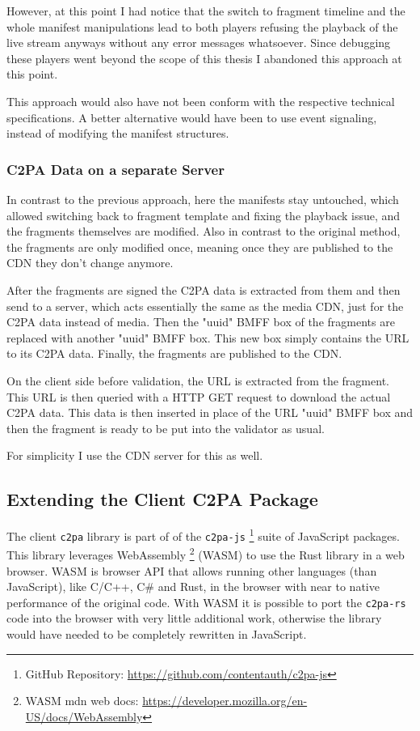 However, at this point I had notice that the switch to fragment timeline and the whole manifest manipulations lead to both players refusing the playback of the live stream anyways without any error messages whatsoever. Since debugging these players went beyond the scope of this thesis I abandoned this approach at this point. 

This approach would also have not been conform with the respective technical specifications. A better alternative would have been to use event signaling, instead of modifying the manifest structures. 

\subsubsection{C2PA Data on a separate Server\label{sec:on_server}}

In contrast to the previous approach, here the manifests stay untouched, which allowed switching back to fragment template and fixing the playback issue, and the fragments themselves are modified. Also in contrast to the original method, the fragments are only modified once, meaning once they are published to the CDN they don't change anymore.

After the fragments are signed the C2PA data is extracted from them and then send to a server, which acts essentially the same as the media CDN, just for the C2PA data instead of media. Then the "uuid" BMFF box of the fragments are replaced with another "uuid" BMFF box. This new box simply contains the URL to its C2PA data. Finally, the fragments are published to the CDN.

On the client side before validation, the URL is extracted from the fragment. This URL is then queried with a HTTP GET request to download the actual C2PA data. This data is then inserted in place of the URL "uuid" BMFF box and then the fragment is ready to be put into the validator as usual.

For simplicity I use the CDN server for this as well.

\subsection{Extending the Client C2PA Package\label{sec:wasm}}

The client \texttt{c2pa} library is part of of the \texttt{c2pa-js} \footnote{GitHub Repository: \url{https://github.com/contentauth/c2pa-js}} suite of JavaScript packages. This library leverages WebAssembly \footnote{WASM mdn web docs: \url{https://developer.mozilla.org/en-US/docs/WebAssembly}} (WASM) to use the Rust library in a web browser. WASM is browser API that allows running other languages (than JavaScript), like C/C++, C$\#$ and Rust, in the browser with near to native performance of the original code. With WASM it is possible to port the \texttt{c2pa-rs} code into the browser with very little additional work, otherwise the library would have needed to be completely rewritten in JavaScript.

